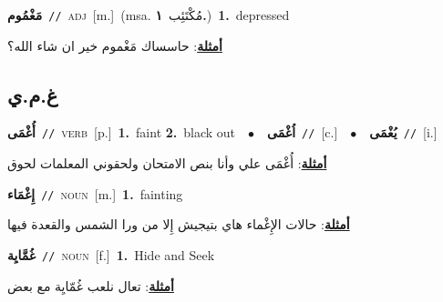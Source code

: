 \documentclass[10pt,a4paper,twoside]{article} %
\begin{document}
\begin{multicols}{2}
{\setlength\topsep{0pt}\textbf{\foreignlanguage{arabic}{مَغْمُوم}}\ {\color{gray}\texttt{//}\color{black}}\ \textsc{adj}\ [m.]\ \color{gray}(msa. \foreignlanguage{arabic}{مُكْتَئِب}~\foreignlanguage{arabic}{\textbf{١.}})\color{black}\ \textbf{1.}~depressed\  \begin{flushright}\color{gray}\foreignlanguage{arabic}{\textbf{\underline{\foreignlanguage{arabic}{أمثلة}}}: حاسساك مَغْموم خير ان شاء الله؟}\end{flushright}\color{black}} \vspace{2mm}

\vspace{-3mm}
\subsection*{\color{blue}\foreignlanguage{arabic}{غ.م.ي}\color{blue}{}} 

{\setlength\topsep{0pt}\textbf{\foreignlanguage{arabic}{أُغْمَى}}\ {\color{gray}\texttt{//}\color{black}}\ \textsc{verb}\ [p.]\ \textbf{1.}~faint  \textbf{2.}~black out\ \ $\bullet$\ \ \setlength\topsep{0pt}\textbf{\foreignlanguage{arabic}{اُغْمَى}}\ {\color{gray}\texttt{//}\color{black}}\ [c.]\ \ $\bullet$\ \ \setlength\topsep{0pt}\textbf{\foreignlanguage{arabic}{يُغْمَى}}\ {\color{gray}\texttt{//}\color{black}}\ [i.]\  \begin{flushright}\color{gray}\foreignlanguage{arabic}{\textbf{\underline{\foreignlanguage{arabic}{أمثلة}}}: أُغْمَى علي وأنا بنص الامتحان ولحقوني المعلمات لحوق}\end{flushright}\color{black}} \vspace{2mm}

{\setlength\topsep{0pt}\textbf{\foreignlanguage{arabic}{إِغْمَاء}}\ {\color{gray}\texttt{//}\color{black}}\ \textsc{noun}\ [m.]\ \textbf{1.}~fainting\  \begin{flushright}\color{gray}\foreignlanguage{arabic}{\textbf{\underline{\foreignlanguage{arabic}{أمثلة}}}: حالات الإِغْماء هاي بتيجيش إِلا من ورا الشمس والقعدة فيها}\end{flushright}\color{black}} \vspace{2mm}

{\setlength\topsep{0pt}\textbf{\foreignlanguage{arabic}{غُمَّايِة}}\ {\color{gray}\texttt{//}\color{black}}\ \textsc{noun}\ [f.]\ \textbf{1.}~Hide and Seek\  \begin{flushright}\color{gray}\foreignlanguage{arabic}{\textbf{\underline{\foreignlanguage{arabic}{أمثلة}}}: تعال نلعب غُمّايِة مع بعض}\end{flushright}\color{black}} \vspace{2mm}


\end{multicols}
\end{document}
